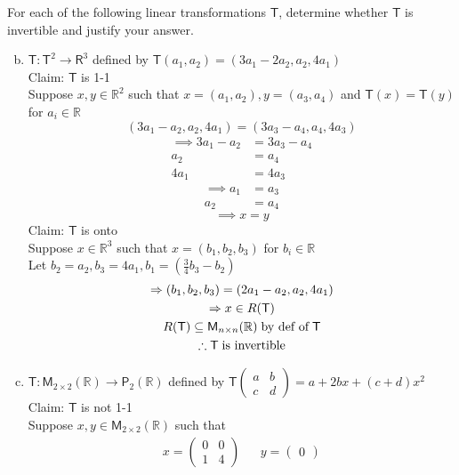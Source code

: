 For each of the following linear transformations $\mathsf{T}$,
determine whether $\mathsf{T}$ is invertible and justify your answer.
\begin{enumerate}[(a)]
\setcounter{enumii}{1}
\item $\mathsf{T}\colon \mathsf{T}^2 \to \mathsf{R}^3$ defined by
  $\mathsf{T}(a_1,a_2) = (3a_1-2a_2,a_2,4a_1)$
\\Claim: $\mathsf{T}$ is 1-1
\\Suppose $x,y\in \mathbb{R}^2$ such that $x=(a_1,a_2), y= (a_3,a_4)$
and $\mathsf{T}(x)=\mathsf{T}(y)$ for $a_i \in \mathbb{R}$
\begin{equation}
(3a_1-a_2,a_2,4a_1) = (3a_3-a_4,a_4,4a_3)
\end{equation}
\begin{align}
\implies 3a_1-a_2 &= 3a_3-a_4\\
a_2&= a_4\\
4a_1&= 4a_3
\end{align}
\begin{align}
\implies a_1&=a_3\\
a_2&=a_4
\end{align}
\begin{equation}
\implies x=y
\end{equation}
Claim: $\mathsf{T}$ is onto
\\Suppose $x\in\mathbb{R}^3$ such that $x=(b_1,b_2,b_3)$ for $b_i\in
\mathbb{R}$
\\Let $b_2=a_2,b_3=4a_1,b_1=(\frac{3}{4}b_3-b_2)$
\begin{gather}
\implies (b_1,b_2,b_3) = (2a_1-a_2,a_2,4a_1)\\
\implies x\in R(\mathsf{T})\\
R(\mathsf{T}) \subseteq \mathsf{M}_{n\times n}(\mathbb{R})\;\text{by
  def of}\; \mathsf{T}\\
\notag \therefore \mathsf{T}\;\text{is invertible}
\end{gather}
\setcounter{enumii}{4}
\item $\mathsf{T}\colon \mathsf{M}_{2\times 2}(\mathbb{R}) \to \mathsf{P}_2(\mathbb{R})$ defined by $\mathsf{T}\begin{pmatrix}a&b\\c&d
  \end{pmatrix} = a + 2bx + (c+d)x^2$
\\Claim: $\mathsf{T}$ is not 1-1
\\Suppose $x,y \in \mathsf{M}_{2\times 2}(\mathbb{R})$ such that
\begin{align}
x = \begin{pmatrix}0 & 0\\ 1 & 4\end{pmatrix}& & y = \begin{pmatrix} 0

\end{pmatrix}
\end{align}
\end{enumerate}
